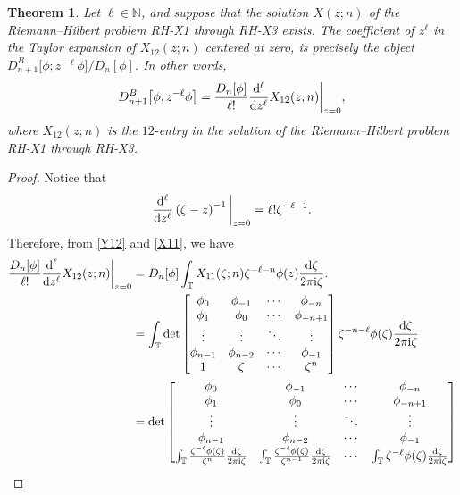\documentclass[10pt,a4paper]{amsart}
\numberwithin{equation}{section}
\newtheorem{Theorem}{Theorem}[section]
\newcommand{\N}{{\mathbb N}}
\newcommand{\T}{{\mathbb T}}
\newcommand{\ze}{\zeta}
\newcommand{\ii}{{\rm i}}
\newcommand{\dd}{{\rm d}}
\begin{document}
	\begin{Theorem}\label{thm border z^-l phi}
		Let $\ell \in \N$, and suppose that the solution $X(z;n)$ of the Riemann--Hilbert problem {\rm RH-X1} through {\rm RH-X3} exists. The coefficient of $z^{\ell}$ in the Taylor expansion of $X_{12}(z;n)$ centered at zero, is precisely the object $D^B_{n+1}\big[\phi;z^{-\ell}\phi\big]/D_n[\phi]$. In other words,
		\begin{equation*}
			D^B_{n+1}\big[\phi;z^{-\ell}\phi\big] = \frac{D_n[\phi]}{\ell!} \frac{\dd ^{\ell}}{\dd z^{\ell}}X_{12}(z;n) \bigg|_{z=0},
		\end{equation*}
		where $X_{12}(z;n)$ is the $12$-entry in the solution of the Riemann--Hilbert problem {\rm RH-X1} through {\rm RH-X3}.
	\end{Theorem}
	
	\begin{proof}
		Notice that
		\begin{equation*}
			\frac{\dd^{\ell}}{\dd z^{\ell}} \left( \ze - z \right)^{-1} \bigg|_{z=0} = \ell ! \ze^{-\ell-1}.
		\end{equation*}
		Therefore, from \eqref{Y12} and \eqref{X11}, we have
		\begin{equation*}
			\begin{split}
				\frac{D_n[\phi]}{\ell!} \frac{\dd ^{\ell}}{\dd z^{\ell}}X_{12}(z;n) \bigg|_{z=0} & = D_n[\phi] \int_{\T} X_{11}(\ze;n) \ze^{-\ell-n} \phi(z) \frac{\dd \ze}{2 \pi \ii \ze}. \\
				& = \int_{\T} \det \begin{bmatrix}
					\phi_0 & \phi_{-1} & \cdots & \phi_{-n} \\
					\phi_1 & \phi_{0} & \cdots & \phi_{-n+1} \\
					\vdots & \vdots & \ddots & \vdots \\
					\phi_{n-1} & \phi_{n-2} & \cdots & \phi_{-1} \\
					1 & \ze & \cdots & \ze^n
				\end{bmatrix} \ze^{-n-\ell} \phi(\ze) \frac{\dd \ze}{2 \pi \ii \ze} \\ & = \det \begin{bmatrix}
					\phi_0 & \phi_{-1} & \cdots & \phi_{-n} \\
					\phi_1 & \phi_0 & \cdots & \phi_{-n+1} \\
					\vdots & \vdots & \ddots & \vdots \\
					\phi_{n-1} & \phi_{n-2} & \cdots & \phi_{-1} \\
					\int_{\T} \frac{ \ze^{-\ell} \phi(\ze)}{\ze^{n}} \frac{\dd \ze}{2 \pi \ii \ze} & \int_{\T} \frac{\ze^{-\ell} \phi(\ze)}{\ze^{n-1}} \frac{\dd \ze}{2 \pi \ii \ze} & \cdots & \int_{\T} \ze^{-\ell} \phi(\ze) \frac{\dd \ze}{2 \pi \ii \ze}

\end{bmatrix}
\end{split}
\end{equation*}
\end{proof}
\end{document}
